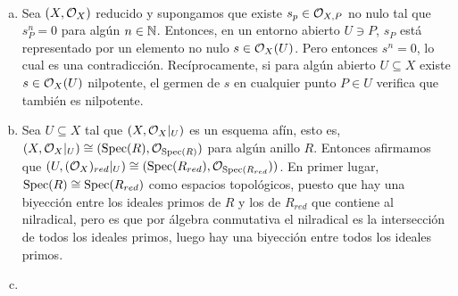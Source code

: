 \documentclass[twoside]{article}
\begin{document}
\begin{solucion}\
\begin{enumerate}[(a)]
\item Sea $(X,{\mathcal O}_X)$ reducido y supongamos que existe $s_p\in {\mathcal O}_{X,P}$ no nulo tal que $s^n_P=0$ para algún $n\in\mathbb{N}$. Entonces, en un entorno abierto $U\ni P$, $s_P$ está representado por un elemento no nulo $s\in{\mathcal O}_X(U)$. Pero entonces $s^n=0$, lo cual es una contradicción. Recíprocamente, si para algún abierto $U\subseteq X$ existe $s\in {\mathcal O}_X(U)$ nilpotente, el germen de $s$ en cualquier punto $P\in U$ verifica que también es nilpotente. 

\item Sea $U\subseteq X$ tal que $(X,{\mathcal O}_X|_{U})$ es un esquema afín, esto es, $(X,{\mathcal O}_X|_{U})\cong (\operatorname{Spec}(R),{\mathcal O}_{\operatorname{Spec}(R)})$ para algún anillo $R$. Entonces afirmamos que $(U, ({\mathcal O}_X)_{red}|_{U})\cong (\operatorname{Spec}(R_{red}), {\mathcal O}_{\operatorname{Spec}(R_{red}}))$. En primer lugar, $\operatorname{Spec}(R)\cong\operatorname{Spec}(R_{red})$ como espacios topológicos, puesto que hay una biyección entre los ideales primos de $R$ y los de $R_{red}$ que contiene al nilradical, pero es que por álgebra conmutativa el nilradical es la intersección de todos los ideales primos, luego hay una biyección entre todos los ideales primos. 
\item 
\end{enumerate}
\end{solucion}

\newpage
\end{document}
